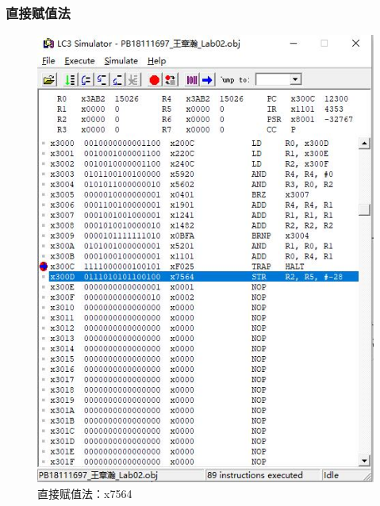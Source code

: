 \documentclass[UTF8]{article}
\begin{document}
	\subsubsection{直接赋值法}
	\begin{figure}[H]
		\begin{minipage}[H]{0.48\linewidth}
			\centering
			\includegraphics[scale=0.4]{x7564_2.jpg}
			\caption{直接赋值法：x7564}
			\label{x7564_2}
		\end{minipage}
		\qquad
		\begin{minipage}[H]{0.48\linewidth}
			\centering

\end{minipage}
\end{figure}
\end{document}
